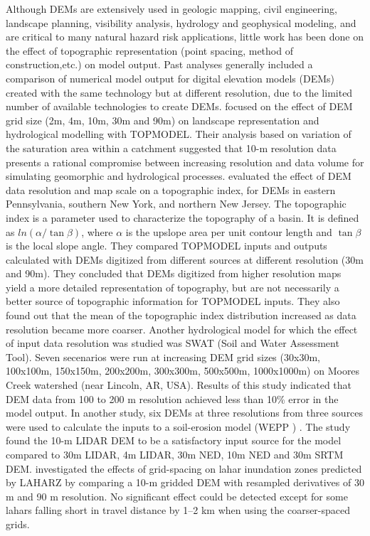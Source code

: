 \documentclass[12pt,letterpaper]{article}
\begin{document}
Although DEMs are extensively used in geologic mapping, civil engineering, landscape
planning, visibility analysis, hydrology and geophysical modeling,
and are critical to many natural hazard risk applications, little work has been 
done on the effect of topographic representation
(point spacing, method of construction,etc.) on model output.
 Past analyses generally included a comparison
of numerical model output for digital elevation models (DEMs) created
with the same technology but at different resolution, due to the
limited number of available technologies to create DEMs.    
 \citet{Zhang1994} focused on the effect of DEM grid
size (2m, 4m, 10m, 30m and 90m) on landscape representation and
hydrological modelling with TOPMODEL. Their analysis based on
  variation of the saturation area within a catchment suggested that
10-m resolution data presents a rational compromise between increasing
resolution and data volume for simulating geomorphic and hydrological
processes. \citet{ Wolock1994} evaluated the effect of DEM
 data resolution and map scale on a topographic index, for DEMs in
 eastern Pennsylvania, southern New York, and northern New Jersey.
 The topographic index is a parameter used to characterize
 the topography of a basin. It is defined as $ln(\alpha/\tan \beta)$, where $\alpha$
 is the upslope area per unit contour length and $\tan \beta$ is the local 
 slope angle.
They compared TOPMODEL inputs and outputs calculated with DEMs
digitized from different sources at different resolution (30m and
90m). They concluded that DEMs digitized from higher resolution maps
yield a more detailed representation of topography, but are not
necessarily a better source of topographic information for TOPMODEL
inputs.  They also found out that the mean of the topographic
index distribution increased as data resolution became more coarser.
Another hydrological model \citep{Chanbey2005} for which the effect of
input data resolution was studied was SWAT (Soil and Water Assessment
Tool). Seven secenarios were run at increasing DEM grid sizes (30x30m,
100x100m, 150x150m, 200x200m, 300x300m, 500x500m, 1000x1000m)
on Moores Creek watershed (near Lincoln, AR, USA). Results of
this study indicated that DEM data from 100 to 200 m resolution
achieved less than 10\% error in the model output. In another study,
six DEMs at three resolutions from three sources were used to
calculate the inputs to a soil-erosion model (WEPP )
\citep{Zhang2008}. The study found the 10-m LIDAR DEM to be a
satisfactory input source for the model compared to 30m LIDAR, 4m
LIDAR, 30m NED, 10m NED and 30m SRTM DEM.
\citet{Stevens}investigated the effects of grid-spacing on
  lahar inundation zones predicted by LAHARZ by comparing a 10-m
  gridded DEM with resampled derivatives of 30 m and 90 m
  resolution. No significant effect could be detected except for some
  lahars falling short in travel distance by 1--2 km when using the
  coarser-spaced grids.
\end{document}
